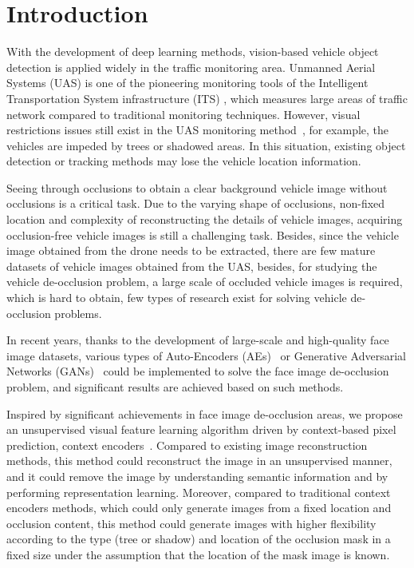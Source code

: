 \section{Introduction}
With the development of deep learning methods, vision-based vehicle object detection is applied widely in the traffic monitoring area. Unmanned Aerial Systems (UAS) is one of the pioneering monitoring tools of the Intelligent Transportation System infrastructure (ITS)  \cite{Yasin2016ARO}, which measures large areas of traffic network compared to traditional monitoring techniques. However, visual restrictions issues still exist in the UAS monitoring method\ \cite{KIM2023103966}, for example, the vehicles are impeded by trees or shadowed areas. In this situation, existing object detection or tracking methods may lose the vehicle location information.

Seeing through occlusions to obtain a clear background vehicle image without occlusions is a critical task. Due to the varying shape of occlusions, non-fixed location and complexity of reconstructing the details of vehicle images, acquiring occlusion-free vehicle images is still a challenging task. Besides, since the vehicle image obtained from the drone needs to be extracted, there are few mature datasets of vehicle images obtained from the UAS, besides, for studying the vehicle de-occlusion problem, a large scale of occluded vehicle images is required, which is hard to obtain, few types of research exist for solving vehicle de-occlusion problems.

In recent years, thanks to the development of large-scale and high-quality face image datasets, various types of Auto-Encoders (AEs)\ \cite{Zhao2018} or Generative Adversarial Networks (GANs)\ \cite{NIPS2014_5ca3e9b1} could be implemented to solve the face image de-occlusion problem, and significant results are achieved based on such methods.

Inspired by significant achievements in face image de-occlusion areas, we propose an unsupervised visual feature learning algorithm driven by context-based pixel prediction, context encoders\ \cite{Pathak_2016_CVPR}.
Compared to existing image reconstruction methods, this method could reconstruct the image in an unsupervised manner, and it could remove the image by understanding semantic information and by performing representation learning. Moreover, compared to traditional context encoders methods, which could only generate images from a fixed location and occlusion content, this method could generate images with higher flexibility according to the type (tree or shadow) and location of the occlusion mask in a fixed size under the assumption that the location of the mask image is known.

